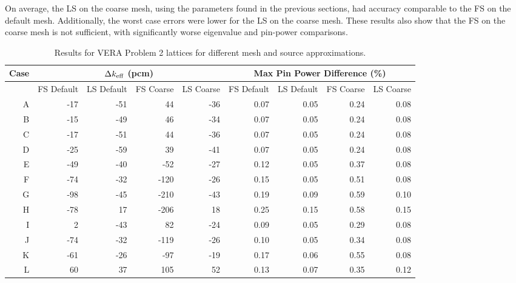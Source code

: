 {{{      On average, the \ac{LS} on the coarse mesh, using the parameters found in the previous sections, had accuracy comparable to the \ac{FS} on the default mesh.
      Additionally, the worst case errors were lower for the \ac{LS} on the coarse mesh.
      These results also show that the \ac{FS} on the coarse mesh is not sufficient, with significantly worse eigenvalue and pin-power comparisons.

      \begin{table}
        \centering
        \caption{Results for VERA Problem 2 lattices for different mesh and source approximations.}
        \footnotesize
        \begin{tabular}{rrrrr@{\hskip 1cm}rrrr} \toprule
          Case  & \multicolumn{4}{c}{$\Delta k_{\text{eff}}$ (pcm)} & \multicolumn{4}{c}{Max Pin Power Difference (\%)}\\\midrule
                & FS Default & LS Default & FS Coarse & LS Coarse & FS Default & LS Default & FS Coarse & LS Coarse\\\midrule
                A    & -17  &   -51   &  44     & -36             & 0.07 & 0.05 & 0.24 & 0.08\\
                B    & -15  &   -49   &  46     & -34             & 0.07 & 0.05 & 0.24 & 0.08\\
                C    & -17  &   -51   &  44     & -36             & 0.07 & 0.05 & 0.24 & 0.08\\
                D    & -25  &   -59   &  39     & -41             & 0.07 & 0.05 & 0.24 & 0.08\\
                E    & -49  &   -40   &  -52    & -27             & 0.12 & 0.05 & 0.37 & 0.08\\
                F    & -74  &   -32   &  -120   & -26             & 0.15 & 0.05 & 0.51 & 0.08\\
                G    & -98  &   -45   &  -210   & -43             & 0.19 & 0.09 & 0.59 & 0.10\\
                H    & -78  &   17    &  -206   & 18              & 0.25 & 0.15 & 0.58 & 0.15\\
                I    & 2    &   -43   &  82     & -24             & 0.09 & 0.05 & 0.29 & 0.08\\
                J    & -74  &   -32   &  -119   & -26             & 0.10 & 0.05 & 0.34 & 0.08\\
                K    & -61  &   -26   &  -97    & -19             & 0.17 & 0.06 & 0.55 & 0.08\\
                L    & 60   &   37    &  105    & 52              & 0.13 & 0.07 & 0.35 & 0.12\\

\end{tabular}
\end{table}}}}
